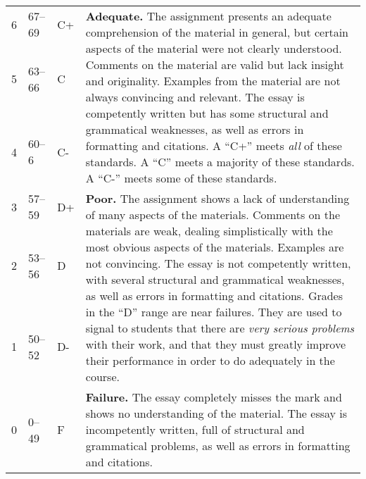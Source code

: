 \documentclass[12pt]{article}
\begin{document}
{\begin{tabular}{|l|l|l|l|}
& & & \\
\hline
\multirow{3}{*}{6} & \multirow{3}{*}{67--69} & \multirow{3}{*}{C+} & \multirow{9}{4in}{\textbf{Adequate.} The assignment presents an adequate comprehension of the material in general, but certain aspects of the material were not clearly understood. Comments on the material are valid but lack insight and originality. Examples from the material are not always convincing and relevant. The essay is competently written but has some structural and grammatical weaknesses, as well as errors in formatting and citations. A ``C+'' meets \textit{all} of these standards. A ``C'' meets a majority of these standards. A ``C-'' meets some of these standards.} \\
& & & \\
& & & \\
\multirow{3}{*}{5} & \multirow{3}{*}{63--66} & \multirow{3}{*}{C} & \\
& & & \\
& & & \\
\multirow{3}{*}{4} & \multirow{3}{*}{60--6} & \multirow{3}{*}{C-} & \\
& & & \\
& & & \\
\hline
\multirow{3}{*}{3} & \multirow{3}{*}{57--59} & \multirow{3}{*}{D+} & \multirow{9}{4in}{\textbf{Poor.} The assignment shows a lack of understanding of many aspects of the materials. Comments on the materials are weak, dealing simplistically with the most obvious aspects of the materials. Examples are not convincing. The essay is not competently written, with several structural and grammatical weaknesses, as well as errors in formatting and citations. Grades in the ``D'' range are near failures. They are used to signal to students that there are \textit{very serious problems} with their work, and that they must greatly improve their performance in order to do adequately in the course.} \\
& & & \\
& & & \\
\multirow{3}{*}{2} & \multirow{3}{*}{53--56} & \multirow{3}{*}{D} & \\
& & & \\
& & & \\
\multirow{3}{*}{1} & \multirow{3}{*}{50--52} & \multirow{3}{*}{D-} & \\
& & & \\
& & & \\
\hline
\multirow{4}{*}{0} & \multirow{4}{*}{0--49} & \multirow{4}{*}{F} & \multirow{4}{4in}{\textbf{Failure.} The essay completely misses the mark and shows no understanding of the material. The essay is incompetently written, full of structural and grammatical problems, as well as errors in formatting and citations.}\\

\end{tabular}}
\end{document}
